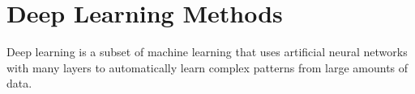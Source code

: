 \section{Deep Learning Methods}
Deep learning is a subset of machine learning that uses artificial neural networks with many layers to automatically learn complex patterns from large amounts of data.